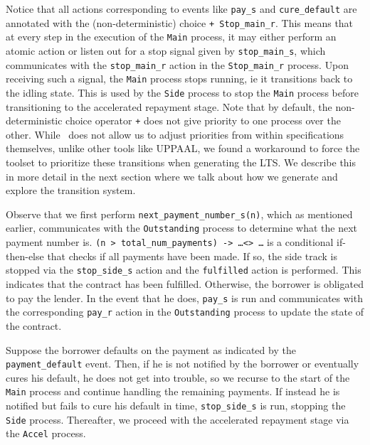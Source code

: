\documentclass{article}
\begin{document}
Notice that all actions corresponding to events like
\texttt{pay\_s} and \texttt{cure\_default} are annotated with the
(non-deterministic) choice \texttt{+ Stop\_main\_r}.
This means that at every step in the execution of the \texttt{Main} process,
it may either perform an atomic action or listen out for a stop signal given by
\texttt{stop\_main\_s}, which communicates with the \texttt{stop\_main\_r}
action in the \texttt{Stop\_main\_r} process.
Upon receiving such a signal, the \texttt{Main} process stops running, ie it
transitions back to the idling state.
This is used by the \texttt{Side} process to stop the \texttt{Main}
process before transitioning to the accelerated repayment stage.
Note that by default, the non-deterministic choice operator \texttt{+}
does not give priority to one process over the other.
While \mcrl \, does not allow us to adjust priorities from within specifications
themselves, unlike other tools like UPPAAL, we found a workaround to force
the toolset to prioritize these transitions when generating the LTS.
We describe this in more detail in the next section where we talk about how
we generate and explore the transition system.




Observe that we first perform \texttt{next\_payment\_number\_s(n)}, which as
mentioned earlier, communicates with the \texttt{Outstanding} process to
determine what the next payment number is.
\texttt{(n > total\_num\_payments) -> \dots <> \dots} is a conditional
if-then-else that checks if all payments have been made.
If so, the side track is stopped via the \texttt{stop\_side\_s} action and
the \texttt{fulfilled} action is performed.
This indicates that the contract has been fulfilled.
Otherwise, the borrower is obligated to pay the lender.
In the event that he does, \texttt{pay\_s} is run and communicates with the
corresponding \texttt{pay\_r} action in the \texttt{Outstanding} process to
update the state of the contract.

Suppose the borrower defaults on the payment as indicated by the
\texttt{payment\_default} event. 
Then, if he is not notified by the borrower or eventually cures his default,
he does not get into trouble, so we recurse to the start of the \texttt{Main}
process and continue handling the remaining payments.
If instead he is notified but fails to cure his default in time,
\texttt{stop\_side\_s} is run, stopping the \texttt{Side} process.
Thereafter, we proceed with the accelerated repayment stage via the
\texttt{Accel} process.
\end{document}
